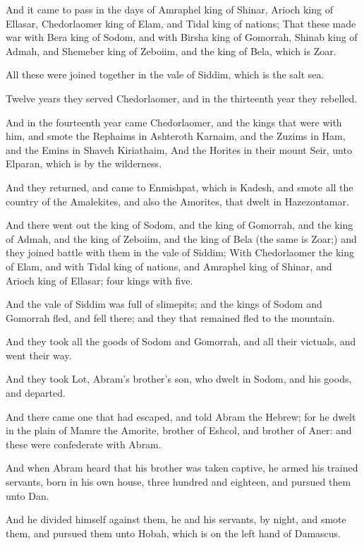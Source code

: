 \verse And it came to pass in the days of Amraphel king of Shinar, Arioch king of Ellasar, Chedorlaomer king of Elam, and Tidal king of nations; \verse That these made war with Bera king of Sodom, and with Birsha king of Gomorrah, Shinab king of Admah, and Shemeber king of Zeboiim, and the king of Bela, which is Zoar.

\verse All these were joined together in the vale of Siddim, which is the salt sea.

\verse Twelve years they served Chedorlaomer, and in the thirteenth year they rebelled.

\verse And in the fourteenth year came Chedorlaomer, and the kings that were with him, and smote the Rephaims in Ashteroth Karnaim, and the Zuzims in Ham, and the Emins in Shaveh Kiriathaim, \verse And the Horites in their mount Seir, unto Elparan, which is by the wilderness.

\verse And they returned, and came to Enmishpat, which is Kadesh, and smote all the country of the Amalekites, and also the Amorites, that dwelt in Hazezontamar.

\verse And there went out the king of Sodom, and the king of Gomorrah, and the king of Admah, and the king of Zeboiim, and the king of Bela (the same is Zoar;) and they joined battle with them in the vale of Siddim; \verse With Chedorlaomer the king of Elam, and with Tidal king of nations, and Amraphel king of Shinar, and Arioch king of Ellasar; four kings with five.

\verse And the vale of Siddim was full of slimepits; and the kings of Sodom and Gomorrah fled, and fell there; and they that remained fled to the mountain.

\verse And they took all the goods of Sodom and Gomorrah, and all their victuals, and went their way.

\verse And they took Lot, Abram's brother's son, who dwelt in Sodom, and his goods, and departed.

\verse And there came one that had escaped, and told Abram the Hebrew; for he dwelt in the plain of Mamre the Amorite, brother of Eshcol, and brother of Aner: and these were confederate with Abram.

\verse And when Abram heard that his brother was taken captive, he armed his trained servants, born in his own house, three hundred and eighteen, and pursued them unto Dan.

\verse And he divided himself against them, he and his servants, by night, and smote them, and pursued them unto Hobah, which is on the left hand of Damascus.


